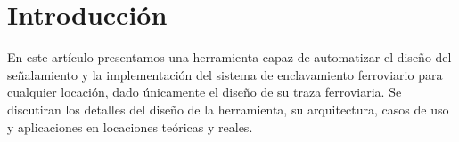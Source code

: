 \chapter{Introducción}

En este artículo presentamos una herramienta capaz de automatizar el diseño del señalamiento y la implementación del sistema de enclavamiento ferroviario para cualquier locación, dado únicamente el diseño de su traza ferroviaria. Se discutiran los detalles del diseño de la herramienta, su arquitectura, casos de uso y aplicaciones en locaciones teóricas y reales.



